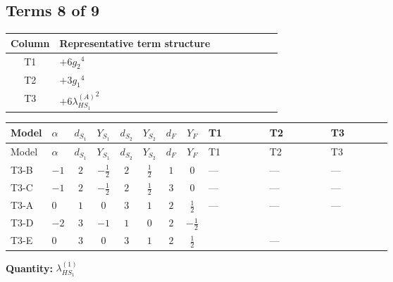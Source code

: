 \documentclass[8pt]{article}
\begin{document}
\begin{landscape}
\subsection*{Terms 8 of 9}
\begin{center}
\begin{tabular}{@{}c >{\raggedright\arraybackslash}p{0.82\linewidth}@{}}
\toprule
Column & Representative term structure \\
\midrule
T1 & \(\displaystyle +6 {g_2}^4\) \\
\midrule
T2 & \(\displaystyle +3 {g_1}^4\) \\
\midrule
T3 & \(\displaystyle +6 {\lambda_{HS_1}^{(A)}}^2\) \\
\midrule
\bottomrule
\end{tabular}
\end{center}
\smallskip
\tiny
\begin{longtable}{@{}llcccccc >{\raggedright\arraybackslash}p{0.21\linewidth} >{\raggedright\arraybackslash}p{0.21\linewidth} >{\raggedright\arraybackslash}p{0.21\linewidth}@{}}
\toprule
Model & $\alpha$ & $d_{S_1}$ & $Y_{S_1}$ & $d_{S_2}$ & $Y_{S_2}$ & $d_F$ & $Y_F$ & T1 & T2 & T3 \\
\midrule
\endfirsthead
\toprule
Model & $\alpha$ & $d_{S_1}$ & $Y_{S_1}$ & $d_{S_2}$ & $Y_{S_2}$ & $d_F$ & $Y_F$ & T1 & T2 & T3 \\
\midrule
\endhead
T3-B & $-1$ & $2$ & $-\frac{1}{2}$ & $2$ & $\frac{1}{2}$ & $1$ & $0$ & --- & --- & --- \\
\midrule
T3-C & $-1$ & $2$ & $-\frac{1}{2}$ & $2$ & $\frac{1}{2}$ & $3$ & $0$ & --- & --- & --- \\
\midrule
T3-A & $0$ & $1$ & $0$ & $3$ & $1$ & $2$ & $\frac{1}{2}$ & --- & --- & --- \\
\midrule
T3-D & $-2$ & $3$ & $-1$ & $1$ & $0$ & $2$ & $-\frac{1}{2}$ & \scriptsize\adjustbox{max width=\linewidth}{$\begin{gathered} +6 {g_2}^4\end{gathered}$} & \scriptsize\adjustbox{max width=\linewidth}{$\begin{gathered} +3 {g_1}^4\end{gathered}$} & \scriptsize\adjustbox{max width=\linewidth}{$\begin{gathered} +6 {\lambda_{HS_1}^{(A)}}^2\end{gathered}$} \\
\midrule
T3-E & $0$ & $3$ & $0$ & $3$ & $1$ & $2$ & $\frac{1}{2}$ & \scriptsize\adjustbox{max width=\linewidth}{$\begin{gathered} +6 {g_2}^4\end{gathered}$} & --- & \scriptsize\adjustbox{max width=\linewidth}{$\begin{gathered} +6 {\lambda_{HS_1}^{(A)}}^2\end{gathered}$} \\
\midrule
\bottomrule
\end{longtable}
\clearpage
\noindent\textbf{Quantity: }$\lambda_{HS_1}^{(1)}$\par\smallskip

\end{landscape}
\end{document}
